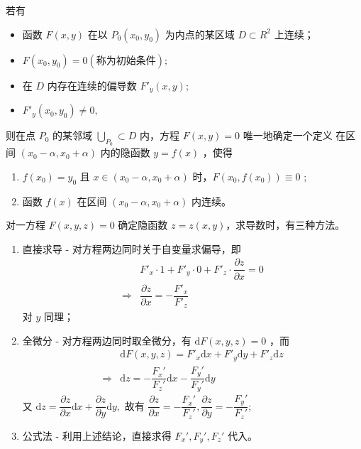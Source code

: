 \begin{Theo}[隐函数存在定理]

    若有
    \begin{itemize}
        \item 函数 $ F(x,y) $ 在以 $ P_0(x_0,y_0) $ 为内点的某区域 $ D\subset R^2 $ 上连续；
        \item $ F(x_0,y_0) = 0 (\textrm{称为初始条件}); $ 
        \item 在 $ D $ 内存在连续的偏导数 $ F'_y(x,y); $ 
        \item $ F'_y(x_0,y_0)\neq0, $ 
    \end{itemize}
    则在点 $ P_0 $ 的某邻域 $ \bigcup_{P_0}\subset D $ 内，方程 $ F(x,y)=0 $ 唯一地确定一个定义
    在区间 $ (x_0-\alpha,x_0+\alpha) $ 内的隐函数 $ y = f(x) $ ，使得
    \begin{enumerate}
        \item $ f(x_0) = y_0 $ 且 $ x\in (x_0-\alpha,x_0+\alpha) $ 时，$ F(x_0,f(x_0)) \equiv 0 $ ;
        \item 函数 $ f(x) $ 在区间 $ (x_0-\alpha,x_0+\alpha) $ 内连续。
    \end{enumerate}
\end{Theo}

对一方程 $ F(x,y,z) = 0 $ 确定隐函数 $ z = z(x,y) $，求导数时，有三种方法。

\begin{enumerate}
    \item 直接求导 - 对方程两边同时关于自变量求偏导，即\begin{equation*}
        \begin{aligned}
            &F'_x \cdot 1 + F'_y \cdot 0 + F'_z \cdot \dfrac{\partial z}{\partial x} = 0\\
            \Rightarrow & \dfrac{\partial z}{\partial x} = -\dfrac{F'_x}{F'_z}
        \end{aligned}
    \end{equation*}
    对 $ y $ 同理；
    \item 全微分 - 对方程两边同时取全微分，有 $ \mathrm{d}F(x,y,z) = 0 $ ，而\begin{equation*}
        \begin{aligned}
            &\mathrm{d}F(x,y,z) = F'_x \mathrm{d}x + F'_y \mathrm{d}y + F'_z\mathrm{d}z\\ 
            \Rightarrow & \mathrm{d}z = -\dfrac{F_x'}{F_z'}\mathrm{d}x - \dfrac{F_y'}{F_y'}\mathrm{d}y
        \end{aligned}
    \end{equation*}
    又 $ \mathrm{d}z = \dfrac{\partial z}{\partial x}\mathrm{d}x + \dfrac{\partial z}{\partial y}\mathrm{d}y, $ 
    故有 $ \dfrac{\partial z}{\partial x} = -\dfrac{F_x'}{F_z'},
    \dfrac{\partial z}{\partial y} = -\dfrac{F_y'}{F_z'}$;
    \item 公式法 - 利用上述结论，直接求得 $ F_x',F_y',F_z' $ 代入。
\end{enumerate}

